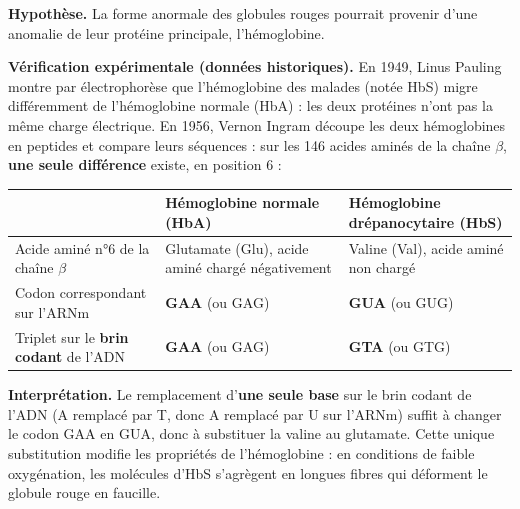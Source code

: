 \documentclass[11pt]{article}
\newcommand{\cle}[1]{{\popxbold\color{popdark}#1}}
\begin{document}
\textbf{Hypothèse.} La forme anormale des globules rouges pourrait provenir d'une anomalie de leur protéine principale, l'\cle{hémoglobine}.

\textbf{Vérification expérimentale (données historiques).} En 1949, Linus Pauling montre par électrophorèse que l'hémoglobine des malades (notée \cle{HbS}) migre différemment de l'hémoglobine normale (\cle{HbA}) : les deux protéines n'ont pas la même charge électrique. En 1956, Vernon Ingram découpe les deux hémoglobines en peptides et compare leurs séquences : sur les 146 acides aminés de la chaîne $\beta$, \textbf{une seule différence} existe, en position 6 :

\begin{center}
\begin{tabularx}{\linewidth}{|l|X|X|}
\hline
\rowcolor{popblueL} & \textbf{Hémoglobine normale (HbA)} & \textbf{Hémoglobine drépanocytaire (HbS)} \\
\hline
Acide aminé n°6 de la chaîne $\beta$ & Glutamate (Glu), acide aminé chargé négativement & Valine (Val), acide aminé non chargé \\
\hline
Codon correspondant sur l'ARNm & \textbf{GAA} (ou GAG) & \textbf{GUA} (ou GUG) \\
\hline
Triplet sur le \textbf{brin codant} de l'ADN & \textbf{GAA} (ou GAG) & \textbf{GTA} (ou GTG) \\
\hline
\end{tabularx}
\end{center}

\textbf{Interprétation.} Le remplacement d'\textbf{une seule base} sur le brin codant de l'ADN (A remplacé par T, donc A remplacé par U sur l'ARNm) suffit à changer le codon GAA en GUA, donc à substituer la valine au glutamate. Cette unique substitution modifie les propriétés de l'hémoglobine : en conditions de faible oxygénation, les molécules d'HbS s'agrègent en longues fibres qui déforment le globule rouge en faucille.
\end{document}

